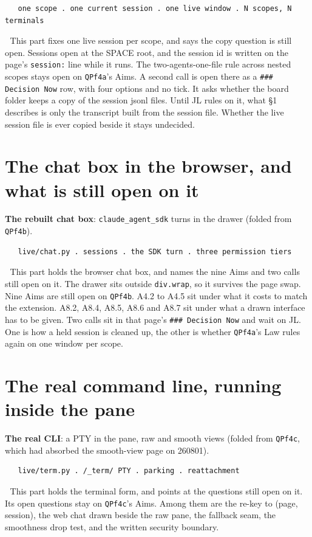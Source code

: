 \begin{verbatim}
   one scope . one current session . one live window . N scopes, N terminals
\end{verbatim}
📌 This part fixes one live session per scope, and says the copy question is still open. Sessions open at the SPACE root, and the session id is written on the page's \texttt{session:} line while it runs. The two-agents-one-file rule across nested scopes stays open on \texttt{QPf4a}'s Aims. A second call is open there as a \texttt{\#\#\# Decision Now} row, with four options and no tick. It asks whether the board folder keeps a copy of the session jsonl files. Until JL rules on it, what §1 describes is only the transcript built from the session file. Whether the live session file is ever copied beside it stays undecided.


\section{The chat box in the browser, and what is still open on it}
\textbf{The rebuilt chat box}: \texttt{claude\_agent\_sdk} turns in the drawer (folded from \texttt{QPf4b}).

\begin{verbatim}
   live/chat.py . sessions . the SDK turn . three permission tiers
\end{verbatim}
📌 This part holds the browser chat box, and names the nine Aims and two calls still open on it. The drawer sits outside \texttt{div.wrap}, so it survives the page swap. Nine Aims are still open on \texttt{QPf4b}. A4.2 to A4.5 sit under what it costs to match the extension. A8.2, A8.4, A8.5, A8.6 and A8.7 sit under what a drawn interface has to be given. Two calls sit in that page's \texttt{\#\#\# Decision Now} and wait on JL. One is how a held session is cleaned up, the other is whether \texttt{QPf4a}'s Law rules again on one window per scope.


\section{The real command line, running inside the pane}
\textbf{The real CLI}: a PTY in the pane, raw and smooth views (folded from \texttt{QPf4c}, which had absorbed the smooth-view page on 260801).

\begin{verbatim}
   live/term.py . /_term/ PTY . parking . reattachment
\end{verbatim}
📌 This part holds the terminal form, and points at the questions still open on it. Its open questions stay on \texttt{QPf4c}'s Aims. Among them are the re-key to (page, session), the web chat drawn beside the raw pane, the fallback seam, the smoothness drop test, and the written security boundary.


